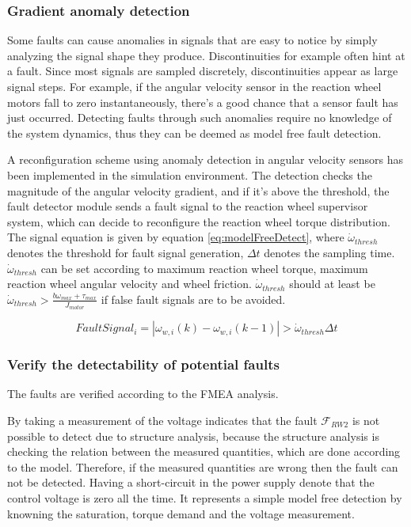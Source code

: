 \subsubsection{Gradient anomaly detection }
\label{sec:ModelFreeFD}

Some faults can cause anomalies in signals that are easy to notice by simply analyzing the signal shape they produce. Discontinuities for example often hint at a fault. Since most signals are sampled discretely, discontinuities appear as large signal steps. For example, if the angular velocity sensor in the reaction wheel motors fall to zero instantaneously, there's a good chance that a sensor fault has just occurred. Detecting faults through such anomalies require no knowledge of the system dynamics, thus they can be deemed as model free fault detection.

A reconfiguration scheme using anomaly detection in angular velocity sensors has been implemented in the simulation environment. The detection checks the magnitude of the angular velocity gradient, and if it's above the threshold, the fault detector module sends a fault signal to the reaction wheel supervisor system, which can decide to reconfigure the reaction wheel torque distribution. The signal equation is given by equation \ref{eq:modelFreeDetect}, where $\dot{\omega}_{thresh}$ denotes the threshold for fault signal generation, $\Delta t$ denotes the sampling time.  $\dot{\omega}_{thresh}$ can be set according to maximum reaction wheel torque, maximum reaction wheel angular velocity and wheel friction. $\dot{\omega}_{thresh}$ should at  least be $\dot{\omega}_{thresh} > \frac{b \omega_{max} + \tau_{max}}{J_{motor}}$ if false fault signals are to be avoided.

\begin{equation}
\label{eq:modelFreeDetect}
FaultSignal_i = |\omega_{w,i}(k) - \omega_{w,i}(k-1)| > \dot{\omega}_{thresh} \Delta t
\end{equation}

\subsubsection{Verify the detectability of potential faults}
The faults are verified according to the FMEA analysis.

By taking a measurement of the voltage indicates that the fault $\mathcal{F}_{RW2}$ is not possible to detect due to structure analysis, because the structure analysis is checking the relation between the measured quantities, which are done according to the model. Therefore, if the measured quantities are wrong then the fault can not be detected.  Having a short-circuit in the power supply denote that the control voltage is zero all the time. It represents a simple model free detection by knowning the saturation, torque demand and the voltage measurement.

